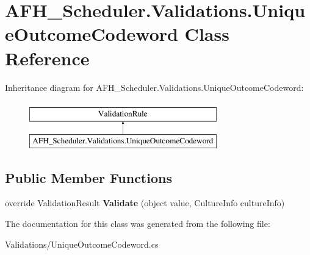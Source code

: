 \section{A\+F\+H\+\_\+\+Scheduler.\+Validations.\+Unique\+Outcome\+Codeword Class Reference}
\label{class_a_f_h___scheduler_1_1_validations_1_1_unique_outcome_codeword}
Inheritance diagram for A\+F\+H\+\_\+\+Scheduler.\+Validations.\+Unique\+Outcome\+Codeword\+:\begin{figure}[H]
\begin{center}
\leavevmode
\includegraphics[height=2.000000cm]{class_a_f_h___scheduler_1_1_validations_1_1_unique_outcome_codeword}
\end{center}
\end{figure}
\subsection*{Public Member Functions}
\begin{DoxyCompactItemize}
\item 
\mbox{\label{class_a_f_h___scheduler_1_1_validations_1_1_unique_outcome_codeword_a692372756635b4fd7f2a12a3917768df}} 
override Validation\+Result {\bfseries Validate} (object value, Culture\+Info culture\+Info)
\end{DoxyCompactItemize}


The documentation for this class was generated from the following file\+:\begin{DoxyCompactItemize}
\item 
Validations/Unique\+Outcome\+Codeword.\+cs\end{DoxyCompactItemize}
